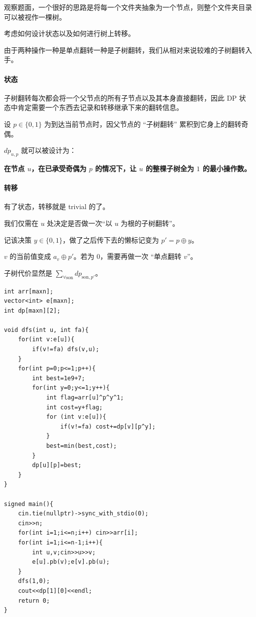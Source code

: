 \documentclass[14pt,a4paper]{article}
\begin{document}
观察题面，一个很好的思路是将每一个文件夹抽象为一个节点，则整个文件夹目录可以被视作一棵树。

考虑如何设计状态以及如何进行树上转移。

由于两种操作一种是单点翻转一种是子树翻转，我们从相对来说较难的子树翻转入手。

\paragraph{状态}
子树翻转每次都会将一个父节点的所有子节点以及其本身直接翻转，因此 DP 状态中肯定需要一个东西去记录和转移继承下来的翻转信息。

设 $p\in\{0,1\}$ 为到达当前节点时，因父节点的 “子树翻转” 累积到它身上的翻转奇偶。

$dp_{u,p}$ 就可以被设计为：

\textbf{在节点 $u$，在已承受奇偶为 $p$ 的情况下，让 $u$ 的整棵子树全为 $1$ 的最小操作数。}

\paragraph{转移}
有了状态，转移就是 trivial 的了。

我们仅需在 $u$ 处决定是否做一次“以 $u$ 为根的子树翻转”。

记该决策 $y\in\{0,1\}$，做了之后传下去的懒标记变为 $p' = p\oplus y$。

$v$ 的当前值变成 $a_v\oplus p'$。若为 $0$，需要再做一次 “单点翻转 $v$”。

子树代价显然是 $\sum_{\forall \text{son}} dp_{\text{son},p'}$。

\begin{verbatim}
int arr[maxn];
vector<int> e[maxn];
int dp[maxn][2];

void dfs(int u, int fa){
    for(int v:e[u]){
        if(v!=fa) dfs(v,u);
    }
    for(int p=0;p<=1;p++){
        int best=1e9+7;
        for(int y=0;y<=1;y++){
            int flag=arr[u]^p^y^1;
            int cost=y+flag;
            for (int v:e[u]){
                if(v!=fa) cost+=dp[v][p^y];
            }
            best=min(best,cost);
        }
        dp[u][p]=best;
    }
}

signed main(){
    cin.tie(nullptr)->sync_with_stdio(0);
    cin>>n;
    for(int i=1;i<=n;i++) cin>>arr[i];
    for(int i=1;i<=n-1;i++){
        int u,v;cin>>u>>v;
        e[u].pb(v);e[v].pb(u);
    }
    dfs(1,0);
    cout<<dp[1][0]<<endl;
    return 0;
}
\end{verbatim}
\end{document}
